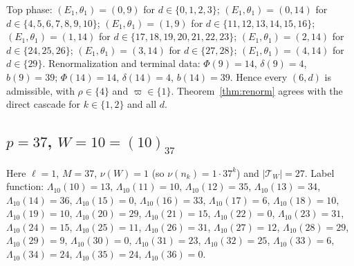 Top phase: $(E_1,\theta_1)=(0,9)$ for $d\in\{0,1,2,3\}$; $(E_1,\theta_1)=(0,14)$ for $d\in\{4,5,6,7,8,9,10\}$; $(E_1,\theta_1)=(1,9)$ for $d\in\{11,12,13,14,15,16\}$; $(E_1,\theta_1)=(1,14)$ for $d\in\{17,18,19,20,21,22,23\}$; $(E_1,\theta_1)=(2,14)$ for $d\in\{24,25,26\}$; $(E_1,\theta_1)=(3,14)$ for $d\in\{27,28\}$; $(E_1,\theta_1)=(4,14)$ for $d\in\{29\}$.
Renormalization and terminal data: $\Phi(9)=14$, $\delta(9)=4$, $b(9)=39$; $\Phi(14)=14$, $\delta(14)=4$, $b(14)=39$. Hence every $(6,d)$ is admissible, with $\rho\in\{4\}$ and $\varpi\in\{1\}$. Theorem~\ref{thm:renorm} agrees with the direct cascade for $k\in\{1,2\}$ and all $d$.

\subsection*{$p=37$, $W=10=(10)_{37}$}
Here $\ell=1$, $M=37$, $\nu(W)=1$ (so $\nu(n_k)=1\cdot37^k$) and $|\mathcal T_W|=27$.
Label function: $\Lambda_{10}(10)=13$, $\Lambda_{10}(11)=10$, $\Lambda_{10}(12)=35$, $\Lambda_{10}(13)=34$, $\Lambda_{10}(14)=36$, $\Lambda_{10}(15)=0$, $\Lambda_{10}(16)=33$, $\Lambda_{10}(17)=6$, $\Lambda_{10}(18)=10$, $\Lambda_{10}(19)=10$, $\Lambda_{10}(20)=29$, $\Lambda_{10}(21)=15$, $\Lambda_{10}(22)=0$, $\Lambda_{10}(23)=31$, $\Lambda_{10}(24)=15$, $\Lambda_{10}(25)=11$, $\Lambda_{10}(26)=31$, $\Lambda_{10}(27)=12$, $\Lambda_{10}(28)=29$, $\Lambda_{10}(29)=9$, $\Lambda_{10}(30)=0$, $\Lambda_{10}(31)=23$, $\Lambda_{10}(32)=25$, $\Lambda_{10}(33)=6$, $\Lambda_{10}(34)=24$, $\Lambda_{10}(35)=24$, $\Lambda_{10}(36)=0$.
